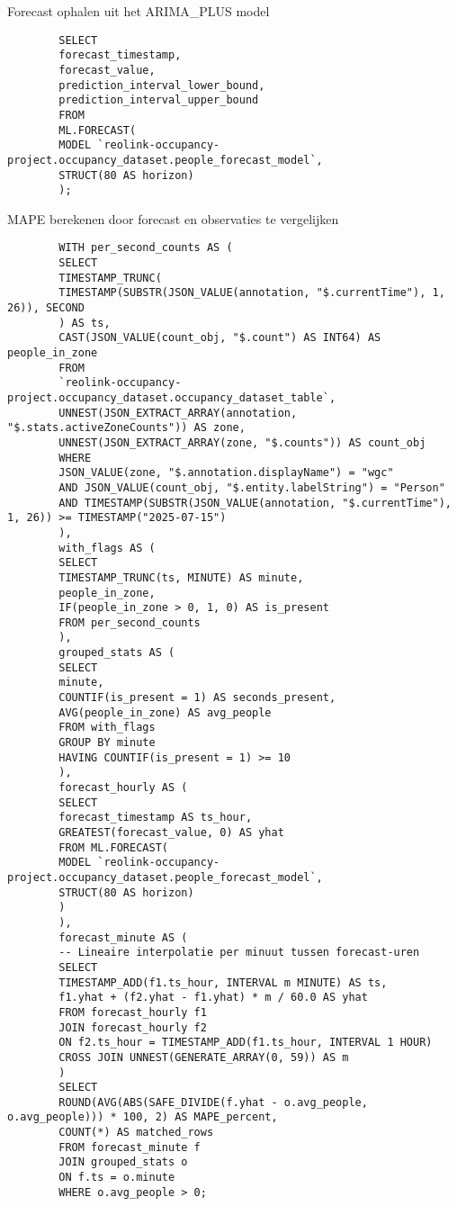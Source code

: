 \documentclass[dutch,dit,thesis]{hogentreport}
\begin{document}
\begin{listing}[H]
    \caption{Forecast ophalen uit het ARIMA\_PLUS model}
    \label{lst:people_forecast_query}
    \begin{verbatim}
        SELECT
        forecast_timestamp,
        forecast_value,
        prediction_interval_lower_bound,
        prediction_interval_upper_bound
        FROM
        ML.FORECAST(
        MODEL `reolink-occupancy-project.occupancy_dataset.people_forecast_model`,
        STRUCT(80 AS horizon)
        );
    \end{verbatim}
\end{listing}


\begin{listing}[H]
    \caption{MAPE berekenen door forecast en observaties te vergelijken}
    \label{lst:people_forecast_mape_query}
    \begin{verbatim}
        WITH per_second_counts AS (
        SELECT
        TIMESTAMP_TRUNC(
        TIMESTAMP(SUBSTR(JSON_VALUE(annotation, "$.currentTime"), 1, 26)), SECOND
        ) AS ts,
        CAST(JSON_VALUE(count_obj, "$.count") AS INT64) AS people_in_zone
        FROM
        `reolink-occupancy-project.occupancy_dataset.occupancy_dataset_table`,
        UNNEST(JSON_EXTRACT_ARRAY(annotation, "$.stats.activeZoneCounts")) AS zone,
        UNNEST(JSON_EXTRACT_ARRAY(zone, "$.counts")) AS count_obj
        WHERE
        JSON_VALUE(zone, "$.annotation.displayName") = "wgc"
        AND JSON_VALUE(count_obj, "$.entity.labelString") = "Person"
        AND TIMESTAMP(SUBSTR(JSON_VALUE(annotation, "$.currentTime"), 1, 26)) >= TIMESTAMP("2025-07-15")
        ),
        with_flags AS (
        SELECT
        TIMESTAMP_TRUNC(ts, MINUTE) AS minute,
        people_in_zone,
        IF(people_in_zone > 0, 1, 0) AS is_present
        FROM per_second_counts
        ),
        grouped_stats AS (
        SELECT
        minute,
        COUNTIF(is_present = 1) AS seconds_present,
        AVG(people_in_zone) AS avg_people
        FROM with_flags
        GROUP BY minute
        HAVING COUNTIF(is_present = 1) >= 10
        ),
        forecast_hourly AS (
        SELECT
        forecast_timestamp AS ts_hour,
        GREATEST(forecast_value, 0) AS yhat
        FROM ML.FORECAST(
        MODEL `reolink-occupancy-project.occupancy_dataset.people_forecast_model`,
        STRUCT(80 AS horizon)
        )
        ),
        forecast_minute AS (
        -- Lineaire interpolatie per minuut tussen forecast-uren
        SELECT
        TIMESTAMP_ADD(f1.ts_hour, INTERVAL m MINUTE) AS ts,
        f1.yhat + (f2.yhat - f1.yhat) * m / 60.0 AS yhat
        FROM forecast_hourly f1
        JOIN forecast_hourly f2
        ON f2.ts_hour = TIMESTAMP_ADD(f1.ts_hour, INTERVAL 1 HOUR)
        CROSS JOIN UNNEST(GENERATE_ARRAY(0, 59)) AS m
        )
        SELECT
        ROUND(AVG(ABS(SAFE_DIVIDE(f.yhat - o.avg_people, o.avg_people))) * 100, 2) AS MAPE_percent,
        COUNT(*) AS matched_rows
        FROM forecast_minute f
        JOIN grouped_stats o
        ON f.ts = o.minute
        WHERE o.avg_people > 0;
    \end{verbatim}
\end{listing}
\end{document}

